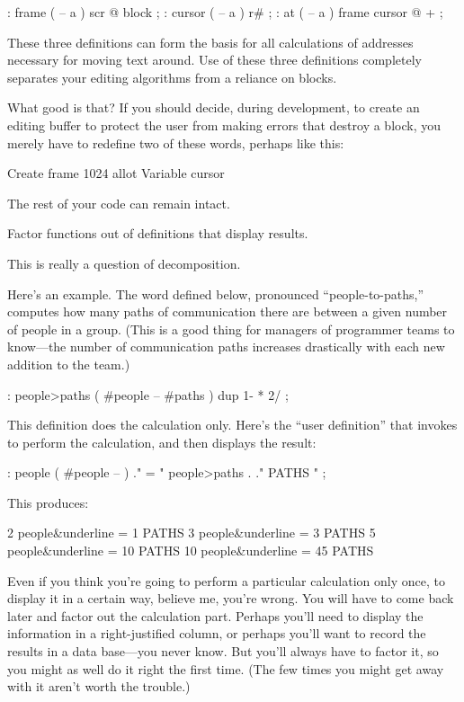 \begin{Code}
: frame  ( -- a )  scr @ block ;
: cursor  ( -- a )  r# ;
: at  ( -- a )  frame  cursor @ + ;
\end{Code}
These three definitions can form the basis for all calculations of
addresses necessary for moving text around. Use of these three
definitions completely separates your editing algorithms from a
reliance on \Forth{} blocks.

What good is that? If you should decide, during development, to create
an editing buffer to protect the user from making errors that destroy
a block, you merely have to redefine two of these words, perhaps like
this:

\begin{Code}
Create frame  1024 allot
Variable cursor
\end{Code}
The rest of your code can remain intact. 

\begin{tip}
Factor functions out of definitions that display results.
\end{tip}
This is really a question of decomposition.

Here's an example. The word defined below, pronounced
``people-to-paths,'' computes how many paths of communication there are
between a given number of people in a group. (This is a good thing for
managers of programmer teams to know---the number of communication
paths increases drastically with each new addition to the team.)
\begin{Code}
: people>paths  ( #people -- #paths )  dup 1-  *  2/ ;
\end{Code}
This definition does the calculation only. Here's the ``user definition''
that invokes  to perform the calculation, and then
displays the result:
\begin{Code}
: people  ( #people -- )
    ." = "  people>paths  .  ." PATHS " ;
\end{Code}
This produces:
\begin{Code}[commandchars=\&\{\}]
2 people&underline{ = 1 PATHS}
3 people&underline{ = 3 PATHS}
5 people&underline{ = 10 PATHS}
10 people&underline{ = 45 PATHS}
\end{Code}
Even if you think you're going to perform a particular calculation
only once, to display it in a certain way, believe me, you're wrong.
You will have to come back later and factor out the calculation part.
Perhaps you'll need to display the information in a right-justified
column, or perhaps you'll want to record the results in a data
base---you never know. But you'll always have to factor it, so you
might as well do it right the first time. (The few times you might get
away with it aren't worth the trouble.)

